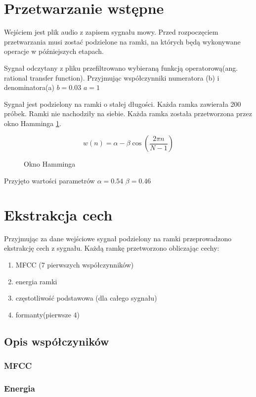 \documentclass[a4paper,12pt,twoside,openany]{report}
\begin{document}
    \section{Przetwarzanie wstępne}
    Wejściem jest plik audio z zapisem sygnału mowy.
    Przed rozpoczęciem przetwarzania musi zostać podzielone na ramki,
    na których będą wykonywane operacje w późniejszych etapach.

    Sygnał odczytany z pliku przefiltrowano wybieraną funkcją operatorową(ang.  rational transfer function).
    Przyjmując współczynniki numeratora (b) i denominatora(a)
    $b = 0.03$ $a = 1$  %

    Sygnał jest podzielony na ramki o stałej długości.
    Każda ramka zawierała 200 próbek.
    Ramki nie nachodziły na siebie.
    Każda ramka została przetworzona przez okno Hamminga \ref{eq:hamming}.

    \begin{figure}
        \label{eq:hamming}
        \[w(n) = \alpha - \beta \cos(\frac{2 \pi n}{N -1})\]
        \caption{Okno Hamminga}
    \end{figure}

    Przyjęto wartości parametrów $\alpha = 0.54$ $\beta = 0.46$


    \section{Ekstrakcja cech}
    Przyjmując za dane wejściowe sygnał podzielony na ramki przeprowadzono ekstrakcję cech z sygnału.
    Każdą ramkę przetworzono obliczając cechy:
    \begin{enumerate}
        \item MFCC (7 pierwszych współczynników)
        \item energia ramki
        \item częstotliwość podstawowa (dla całego sygnału)
        \item formanty(pierwsze 4)
    \end{enumerate}
    \subsection{Opis współczyników}
    \subsubsection{MFCC}
    \subsubsection{Energia}
\end{document}
